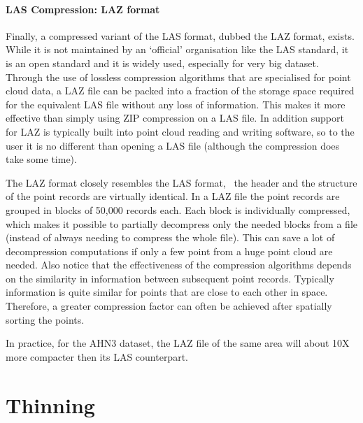 

\paragraph{LAS Compression: LAZ format}
Finally, a compressed variant of the LAS format, dubbed the LAZ format, exists.
While it is not maintained by an `official' organisation like the LAS standard, it is an open standard and it is widely used, especially for very big dataset.
Through the use of lossless compression algorithms that are specialised for point cloud data, a LAZ file can be packed into a fraction of the storage space required for the equivalent LAS file without any loss of information.
This makes it more effective than simply using ZIP compression on a LAS file.
In addition support for LAZ is typically built into point cloud reading and writing software, so to the user it is no different than opening a LAS file (although the compression does take some time).

The LAZ format closely resembles the LAS format, \ie\ the header and the structure of the point records are virtually identical.
In a LAZ file the point records are grouped in blocks of 50,000 records each.
Each block is individually compressed, which makes it possible to partially decompress only the needed blocks from a file (instead of always needing to compress the whole file).
This can save a lot of decompression computations if only a few point from a huge point cloud are needed.
Also notice that the effectiveness of the compression algorithms depends on the similarity in information between subsequent point records.
Typically information is quite similar for points that are close to each other in space.
Therefore, a greater compression factor can often be achieved after spatially sorting the points.

In practice, for the AHN3 dataset, the LAZ file of the same area will about 10X more compacter then its LAS counterpart.


%
\section{Thinning}

